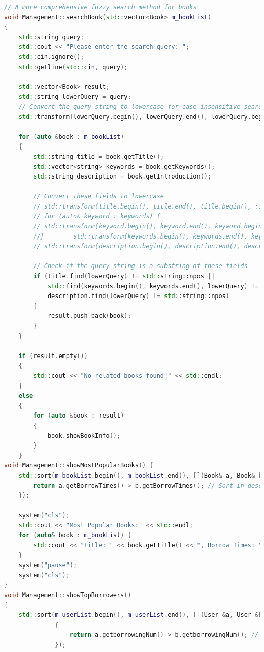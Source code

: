 \documentclass[12pt,twoside]{ctexart}
\begin{document}
\begin{lstlisting}[language=C++]
// A more comprehensive fuzzy search method for books
void Management::searchBook(std::vector<Book> m_bookList)
{
    std::string query;
    std::cout << "Please enter the search query: ";
    std::cin.ignore();
    std::getline(std::cin, query);

    std::vector<Book> result;
    std::string lowerQuery = query;
    // Convert the query string to lowercase for case-insensitive search
    std::transform(lowerQuery.begin(), lowerQuery.end(), lowerQuery.begin(), ::tolower);

    for (auto &book : m_bookList)
    {
        std::string title = book.getTitle();
        std::vector<string> keywords = book.getKeywords();
        std::string description = book.getIntroduction();

        // Convert these fields to lowercase
        // std::transform(title.begin(), title.end(), title.begin(), ::tolower);
        // for (auto& keyword : keywords) {
        // std::transform(keyword.begin(), keyword.end(), keyword.begin(), ::tolower);
        //}        std::transform(keywords.begin(), keywords.end(), keywords.begin(), ::tolower);
        // std::transform(description.begin(), description.end(), description.begin(), ::tolower);

        // Check if the query string is a substring of these fields
        if (title.find(lowerQuery) != std::string::npos ||
            std::find(keywords.begin(), keywords.end(), lowerQuery) != keywords.end() ||
            description.find(lowerQuery) != std::string::npos)
        {
            result.push_back(book);
        }
    }

    if (result.empty())
    {
        std::cout << "No related books found!" << std::endl;
    }
    else
    {
        for (auto &book : result)
        {
            book.showBookInfo();
        }
    }
void Management::showMostPopularBooks() {
    std::sort(m_bookList.begin(), m_bookList.end(), [](Book& a, Book& b) {
        return a.getBorrowTimes() > b.getBorrowTimes(); // Sort in descending order based on borrowing times
    });

    system("cls");
    std::cout << "Most Popular Books:" << std::endl;
    for (auto& book : m_bookList) {
        std::cout << "Title: " << book.getTitle() << ", Borrow Times: " << book.getBorrowTimes() << std::endl;
    }
    system("pause");
    system("cls");
}
void Management::showTopBorrowers()
{
    std::sort(m_userList.begin(), m_userList.end(), [](User &a, User &b)
              {
                  return a.getborrowingNum() > b.getborrowingNum(); // Sort in descending order based on borrowing number
              });


\end{lstlisting}
\end{document}
